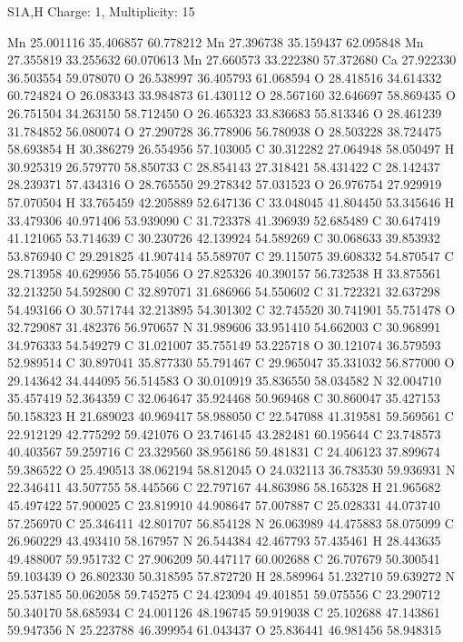 \documentclass{article}
\begin{document}
S1A,H   Charge: 1, Multiplicity: 15
   
Mn 25.001116 35.406857 60.778212
Mn 27.396738 35.159437 62.095848
Mn 27.355819 33.255632 60.070613
Mn 27.660573 33.222380 57.372680
Ca 27.922330 36.503554 59.078070
O 26.538997 36.405793 61.068594
O 28.418516 34.614332 60.724824
O 26.083343 33.984873 61.430112
O 28.567160 32.646697 58.869435
O 26.751504 34.263150 58.712450
O 26.465323 33.836683 55.813346
O 28.461239 31.784852 56.080074
O 27.290728 36.778906 56.780938
O 28.503228 38.724475 58.693854
H 30.386279 26.554956 57.103005
C 30.312282 27.064948 58.050497
H 30.925319 26.579770 58.850733
C 28.854143 27.318421 58.431422
C 28.142437 28.239371 57.434316
O 28.765550 29.278342 57.031523
O 26.976754 27.929919 57.070504
H 33.765459 42.205889 52.647136
C 33.048045 41.804450 53.345646
H 33.479306 40.971406 53.939090
C 31.723378 41.396939 52.685489
C 30.647419 41.121065 53.714639
C 30.230726 42.139924 54.589269
C 30.068633 39.853932 53.876940
C 29.291825 41.907414 55.589707
C 29.115075 39.608332 54.870547
C 28.713958 40.629956 55.754056
O 27.825326 40.390157 56.732538
H 33.875561 32.213250 54.592800
C 32.897071 31.686966 54.550602
C 31.722321 32.637298 54.493166
O 30.571744 32.213895 54.301302
C 32.745520 30.741901 55.751478
O 32.729087 31.482376 56.970657
N 31.989606 33.951410 54.662003
C 30.968991 34.976333 54.549279
C 31.021007 35.755149 53.225718
O 30.121074 36.579593 52.989514
C 30.897041 35.877330 55.791467
C 29.965047 35.331032 56.877000
O 29.143642 34.444095 56.514583
O 30.010919 35.836550 58.034582
N 32.004710 35.457419 52.364359
C 32.064647 35.924468 50.969468
C 30.860047 35.427153 50.158323
H 21.689023 40.969417 58.988050
C 22.547088 41.319581 59.569561
C 22.912129 42.775292 59.421076
O 23.746145 43.282481 60.195644
C 23.748573 40.403567 59.259716
C 23.329560 38.956186 59.481831
C 24.406123 37.899674 59.386522
O 25.490513 38.062194 58.812045
O 24.032113 36.783530 59.936931
N 22.346411 43.507755 58.445566
C 22.797167 44.863986 58.165328
H 21.965682 45.497422 57.900025
C 23.819910 44.908647 57.007887
C 25.028331 44.073740 57.256970
C 25.346411 42.801707 56.854128
N 26.063989 44.475883 58.075099
C 26.960229 43.493410 58.167957
N 26.544384 42.467793 57.435461
H 28.443635 49.488007 59.951732
C 27.906209 50.447117 60.002688
C 26.707679 50.300541 59.103439
O 26.802330 50.318595 57.872720
H 28.589964 51.232710 59.639272
N 25.537185 50.062058 59.745275
C 24.423094 49.401851 59.075556
C 23.290712 50.340170 58.685934
C 24.001126 48.196745 59.919038
C 25.102688 47.143861 59.947356
N 25.223788 46.399954 61.043437
O 25.836441 46.981456 58.948315
\end{document}
